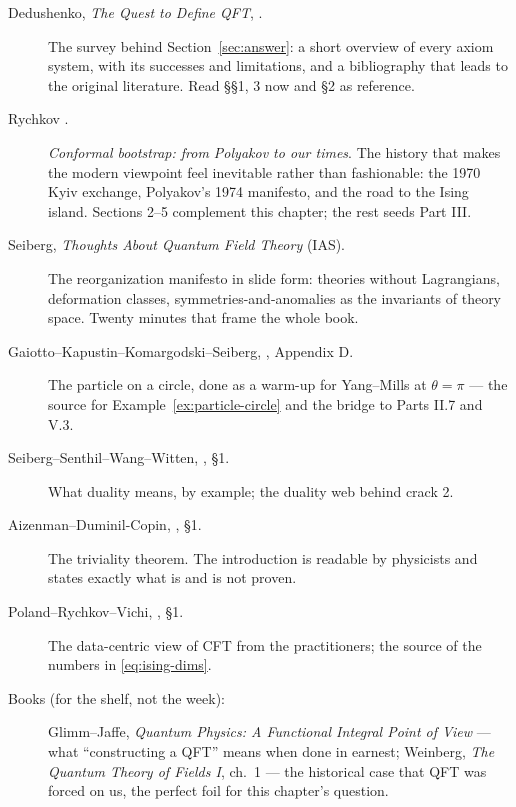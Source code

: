 \begin{description}
\item[Dedushenko, \emph{The Quest to Define QFT}, .] The
survey behind Section~\ref{sec:answer}: a short overview of every axiom
system, with its successes and limitations, and a bibliography that leads to
the original literature. Read \S\S1, 3 now and \S2 as reference.
\item[Rychkov .] \emph{Conformal bootstrap: from Polyakov to
our times}. The history that makes the modern viewpoint feel inevitable rather
than fashionable: the 1970 Kyiv exchange, Polyakov's 1974 manifesto, and the
road to the Ising island. Sections 2--5 complement this chapter; the rest seeds
Part III.
\item[Seiberg, \emph{Thoughts About Quantum Field Theory} (IAS).] The
reorganization manifesto in slide form: theories without Lagrangians,
deformation classes, symmetries-and-anomalies as the invariants of theory space.
Twenty minutes that frame the whole book.
\item[Gaiotto--Kapustin--Komargodski--Seiberg, , Appendix D.]
The particle on a circle, done as a warm-up for Yang--Mills at $\theta = \pi$
--- the source for Example~\ref{ex:particle-circle} and the bridge to Parts II.7
and V.3.
\item[Seiberg--Senthil--Wang--Witten, , \S1.] What duality
means, by example; the duality web behind crack 2.
\item[Aizenman--Duminil-Copin, , \S1.] The triviality theorem.
The introduction is readable by physicists and states exactly what is and is not
proven.
\item[Poland--Rychkov--Vichi, , \S1.] The data-centric view of
CFT from the practitioners; the source of the numbers in \eqref{eq:ising-dims}.
\item[Books (for the shelf, not the week):] Glimm--Jaffe, \emph{Quantum Physics:
A Functional Integral Point of View} --- what ``constructing a QFT'' means when
done in earnest; Weinberg, \emph{The Quantum Theory of Fields I}, ch.\ 1 --- the
historical case that QFT was forced on us, the perfect foil for this chapter's
question.
\end{description}
